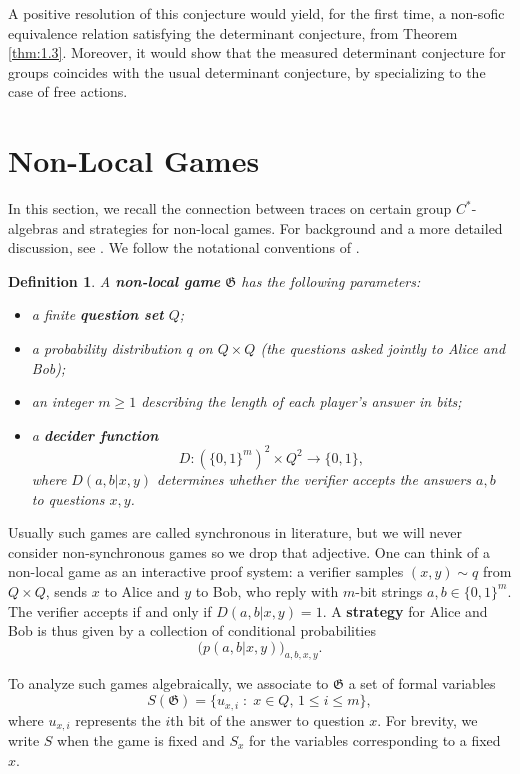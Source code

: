 \documentclass[pdflatex,sn-mathphys-num]{sn-jnl}%
\newtheorem{definition}[theorem]{Definition}
\begin{document}
A positive resolution of this conjecture would yield, for the first time, a non-sofic equivalence relation satisfying the determinant conjecture, from Theorem \ref{thm:1.3}. Moreover, it would show that the measured determinant conjecture for groups coincides with the usual determinant conjecture, by specializing to the case of free actions.



\section{Non-Local Games}\label{sec:3}

In this section, we recall the connection between traces on certain group $C^*$-algebras and strategies for non-local games.  
For background and a more detailed discussion, see \cite[Sections~4--5]{goldbring_connes_2021}.  
We follow the notational conventions of \cite{manzoor_there_2025}.

\begin{definition}
    A \textbf{non-local game} $\mathfrak{G}$ has the following parameters:
    \begin{itemize}
        \item a finite \textbf{question set} $Q$;
        \item a probability distribution $q$ on $Q \times Q$ (the questions asked jointly to Alice and Bob);
        \item an integer $m \geq 1$ describing the length of each player's answer in bits;
        \item a \textbf{decider function} 
        \[
            D : (\{0,1\}^m)^2 \times Q^2 \to \{0,1\}, 
        \]
        where $D(a,b |x,y)$ determines whether the verifier accepts the answers $a,b$ to questions $x,y$.
    \end{itemize}
\end{definition}

Usually such games are called synchronous in literature, but we will never consider non-synchronous games so we drop that adjective. One can think of a non-local game as an interactive proof system:  
a verifier samples $(x,y) \sim q$ from $Q \times Q$, sends $x$ to Alice and $y$ to Bob,  
who reply with $m$-bit strings $a,b \in \{0,1\}^m$.  
The verifier accepts if and only if $D(a,b |x,y) = 1$.  
A \textbf{strategy} for Alice and Bob is thus given by a collection of conditional probabilities  
\[
    \big(p(a,b|x,y) \big)_{a,b,x,y}.
\]

To analyze such games algebraically, we associate to $\mathfrak{G}$ a set of formal variables
\[
    S(\mathfrak{G}) = \{ u_{x,i} \;:\; x \in Q,\, 1 \leq i \leq m \},
\]
where $u_{x,i}$ represents the $i$th bit of the answer to question $x$.  
For brevity, we write $S$ when the game is fixed and $S_x$ for the variables corresponding to a fixed $x$.
\end{document}
